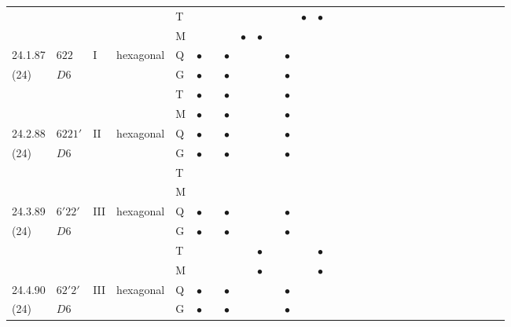 \documentclass[fleqn,9pt,landscape]{jsarticle}
\begin{document}
\begin{longtable}{lllll|l|l|l|l|l|l|l|l|l|ll|ll|ll|ll|ll|ll|ll|ll}
 &  &  &  & T &  &  &  &  &  &  &  & $\bullet$ & $\bullet$ &  &  &  &  &  &  &  &  &  &  &  &  &  &  &  &  \\
 &  &  &  & M &  &  &  & $\bullet$ & $\bullet$ &  &  &  &  &  &  &  &  &  &  &  &  &  &  &  &  &  &  &  &  \\ \hline
24.1.87 & \texttt{$622$} & I & hexagonal & Q & $\bullet$ &  & $\bullet$ &  &  &  & $\bullet$ &  &  &  &  &  &  &  &  &  &  &  &  &  &  &  &  &  &  \\
(24) & $D6$ &  &  & G & $\bullet$ &  & $\bullet$ &  &  &  & $\bullet$ &  &  &  &  &  &  &  &  &  &  &  &  &  &  &  &  &  &  \\
 &  &  &  & T & $\bullet$ &  & $\bullet$ &  &  &  & $\bullet$ &  &  &  &  &  &  &  &  &  &  &  &  &  &  &  &  &  &  \\
 &  &  &  & M & $\bullet$ &  & $\bullet$ &  &  &  & $\bullet$ &  &  &  &  &  &  &  &  &  &  &  &  &  &  &  &  &  &  \\ \hline
24.2.88 & \texttt{$6221'$} & II & hexagonal & Q & $\bullet$ &  & $\bullet$ &  &  &  & $\bullet$ &  &  &  &  &  &  &  &  &  &  &  &  &  &  &  &  &  &  \\
(24) & $D6$ &  &  & G & $\bullet$ &  & $\bullet$ &  &  &  & $\bullet$ &  &  &  &  &  &  &  &  &  &  &  &  &  &  &  &  &  &  \\
 &  &  &  & T &  &  &  &  &  &  &  &  &  &  &  &  &  &  &  &  &  &  &  &  &  &  &  &  &  \\
 &  &  &  & M &  &  &  &  &  &  &  &  &  &  &  &  &  &  &  &  &  &  &  &  &  &  &  &  &  \\ \hline
24.3.89 & \texttt{$6'22'$} & III & hexagonal & Q & $\bullet$ &  & $\bullet$ &  &  &  & $\bullet$ &  &  &  &  &  &  &  &  &  &  &  &  &  &  &  &  &  &  \\
(24) & $D6$ &  &  & G & $\bullet$ &  & $\bullet$ &  &  &  & $\bullet$ &  &  &  &  &  &  &  &  &  &  &  &  &  &  &  &  &  &  \\
 &  &  &  & T &  &  &  &  & $\bullet$ &  &  &  & $\bullet$ &  &  &  &  &  &  &  &  &  &  &  &  &  &  &  &  \\
 &  &  &  & M &  &  &  &  & $\bullet$ &  &  &  & $\bullet$ &  &  &  &  &  &  &  &  &  &  &  &  &  &  &  &  \\ \hline
24.4.90 & \texttt{$62'2'$} & III & hexagonal & Q & $\bullet$ &  & $\bullet$ &  &  &  & $\bullet$ &  &  &  &  &  &  &  &  &  &  &  &  &  &  &  &  &  &  \\
(24) & $D6$ &  &  & G & $\bullet$ &  & $\bullet$ &  &  &  & $\bullet$ &  &  &  &  &  &  &  &  &  &  &  &  &  &  &  &  &  &  \\

\end{longtable}
\end{document}
